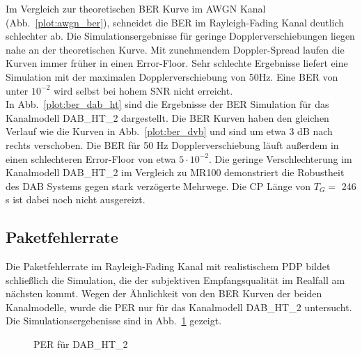 Im Vergleich zur theoretischen BER Kurve im AWGN Kanal (Abb.~\ref{plot:awgn_ber}), schneidet die BER im Rayleigh-Fading Kanal deutlich schlechter ab. Die Simulationsergebnisse für geringe Dopplerverschiebungen liegen nahe an der theoretischen Kurve. Mit zunehmendem Doppler-Spread laufen die Kurven immer früher in einen Error-Floor. Sehr schlechte Ergebnisse liefert eine Simulation mit der maximalen Dopplerverschiebung von 50Hz. Eine BER von unter $10^{-2}$ wird selbst bei hohem SNR nicht erreicht.
\\
In Abb.~\ref{plot:ber_dab_ht} sind die Ergebnisse der BER Simulation für das Kanalmodell DAB\_HT\_2 dargestellt. Die BER Kurven haben den gleichen Verlauf wie die Kurven in Abb.~\ref{plot:ber_dvb} und sind um etwa 3 dB nach rechts verschoben. Die BER für 50 Hz Dopplerverschiebung läuft außerdem in einen schlechteren Error-Floor von etwa $5\cdot 10^{-2}$. Die geringe Verschlechterung im Kanalmodell DAB\_HT\_2 im Vergleich zu MR100 demonstriert die Robustheit des DAB Systems gegen stark verzögerte Mehrwege. Die CP Länge von $T_G =$ 246 \textmu s ist dabei noch nicht ausgereizt.\\

\subsection{Paketfehlerrate}
Die Paketfehlerrate im Rayleigh-Fading Kanal mit realistischem PDP bildet schließlich die Simulation, die der subjektiven Empfangsqualität im Realfall am nächsten kommt. Wegen der Ähnlichkeit von den BER Kurven der beiden Kanalmodelle, wurde die PER nur für das Kanalmodell DAB\_HT\_2 untersucht. Die Simulationsergebenisse sind in Abb.~\ref{plot:doppler_per} gezeigt.

\begin{figure}[htb]
\begin{center}
\end{center}
\caption{PER für DAB\_HT\_2}
\label{plot:doppler_per}
\end{figure}


